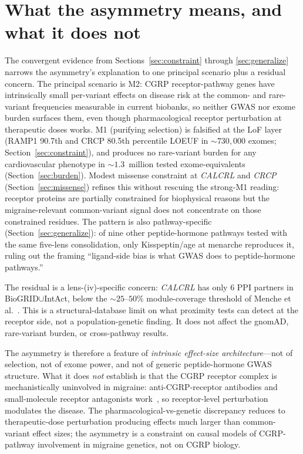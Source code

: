 \documentclass[11pt]{article}
\begin{document}
\section{What the asymmetry means, and what it does not}

The convergent evidence from Sections~\ref{sec:constraint} through \ref{sec:generalize} narrows the asymmetry's explanation to one principal scenario plus a residual concern. The principal scenario is M2: CGRP receptor-pathway genes have intrinsically small per-variant effects on disease risk at the common- and rare-variant frequencies measurable in current biobanks, so neither GWAS nor exome burden surfaces them, even though pharmacological receptor perturbation at therapeutic doses works. M1 (purifying selection) is falsified at the LoF layer (RAMP1 90.7th and CRCP 80.5th percentile LOEUF in $\sim 730{,}000$ exomes; Section~\ref{sec:constraint}), and produces no rare-variant burden for any cardiovascular phenotype in $\sim 1.3$~million tested exome-equivalents (Section~\ref{sec:burden}). Modest missense constraint at \textit{CALCRL} and \textit{CRCP} (Section~\ref{sec:missense}) refines this without rescuing the strong-M1 reading: receptor proteins are partially constrained for biophysical reasons but the migraine-relevant common-variant signal does not concentrate on those constrained residues. The pattern is also pathway-specific (Section~\ref{sec:generalize}): of nine other peptide-hormone pathways tested with the same five-lens consolidation, only Kisspeptin/age at menarche reproduces it, ruling out the framing ``ligand-side bias is what GWAS does to peptide-hormone pathways.''

The residual is a lens-(iv)-specific concern: \textit{CALCRL} has only 6 PPI partners in BioGRID$\cup$IntAct, below the $\sim 25$--$50\%$ module-coverage threshold of Menche et al.~\cite{menche_2015_diseaseome}. This is a structural-database limit on what proximity tests can detect at the receptor side, not a population-genetic finding. It does not affect the gnomAD, rare-variant burden, or cross-pathway results.

The asymmetry is therefore a feature of \emph{intrinsic effect-size architecture}---not of selection, not of exome power, and not of generic peptide-hormone GWAS structure. What it does \emph{not} establish is that the CGRP receptor complex is mechanistically uninvolved in migraine: anti-CGRP-receptor antibodies and small-molecule receptor antagonists work~\cite{goadsby_2017_strive_erenumab,croop_2019_rimegepant,ailani_2021_advance_atogepant}, so receptor-level perturbation modulates the disease. The pharmacological-vs-genetic discrepancy reduces to therapeutic-dose perturbation producing effects much larger than common-variant effect sizes; the asymmetry is a constraint on causal models of CGRP-pathway involvement in migraine genetics, not on CGRP biology.
\end{document}
